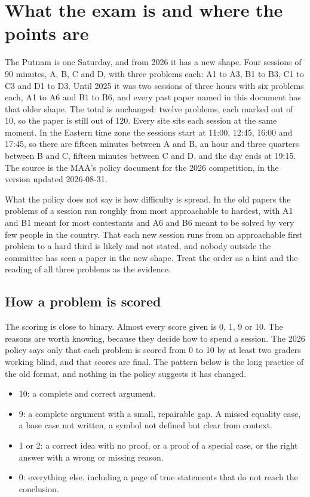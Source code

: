 \section{What the exam is and where the points are}

The Putnam is one Saturday, and from 2026 it has a new shape. Four sessions of 90 minutes, A, B, C and D, with three problems each: A1 to A3, B1 to B3, C1 to C3 and D1 to D3. Until 2025 it was two sessions of three hours with six problems each, A1 to A6 and B1 to B6, and every past paper named in this document has that older shape. The total is unchanged: twelve problems, each marked out of 10, so the paper is still out of 120. Every site sits each session at the same moment. In the Eastern time zone the sessions start at 11:00, 12:45, 16:00 and 17:45, so there are fifteen minutes between A and B, an hour and three quarters between B and C, fifteen minutes between C and D, and the day ends at 19:15. The source is the MAA's policy document for the 2026 competition, in the version updated 2026-08-31.

What the policy does not say is how difficulty is spread. In the old papers the problems of a session ran roughly from most approachable to hardest, with A1 and B1 meant for most contestants and A6 and B6 meant to be solved by very few people in the country. That each new session runs from an approachable first problem to a hard third is likely and not stated, and nobody outside the committee has seen a paper in the new shape. Treat the order as a hint and the reading of all three problems as the evidence.

\subsection*{How a problem is scored}

The scoring is close to binary. Almost every score given is 0, 1, 9 or 10. The reasons are worth knowing, because they decide how to spend a session. The 2026 policy says only that each problem is scored from 0 to 10 by at least two graders working blind, and that scores are final. The pattern below is the long practice of the old format, and nothing in the policy suggests it has changed.

\begin{itemize}[nosep,leftmargin=*]
\item 10: a complete and correct argument.
\item 9: a complete argument with a small, repairable gap. A missed equality case, a base case not written, a symbol not defined but clear from context.
\item 1 or 2: a correct idea with no proof, or a proof of a special case, or the right answer with a wrong or missing reason.
\item 0: everything else, including a page of true statements that do not reach the conclusion.
\end{itemize}

